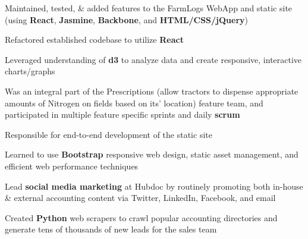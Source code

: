 \documentclass[letterpaper]{deedy-resume} %
\begin{document}
\begin{minipage}[t]{0.66\textwidth}

  \begin{tightitemize}
  \item Maintained, tested, \& added features to the FarmLogs WebApp and static site (using \textbf{React}, \textbf{Jasmine}, \textbf{Backbone}, and \textbf{HTML/CSS/jQuery})
  \item Refactored established codebase to utilize \textbf{React}
  \item Leveraged understanding of \textbf{d3} to analyze data and create responsive, interactive charts/graphs
  \item Was an integral part of the Prescriptions (allow tractors to dispense appropriate amounts of Nitrogen on fields based on its' location) feature team, and participated in multiple feature specific sprints and daily \textbf{scrum}
  \end{tightitemize}

  \sectionspace %



  \begin{tightitemize}
  \item Responsible for end-to-end development of the static site
  \item Learned to use \textbf{Bootstrap} responsive web design, static asset management, and efficient web performance techniques
  \item Lead \textbf{social media marketing} at Hubdoc by routinely promoting both in-house \& external accounting content via Twitter, LinkedIn, Facebook, and email
  \item Created \textbf{Python} web scrapers to crawl popular accounting directories and generate tens of thousands of new leads for the sales team
  \end{tightitemize}

  \sectionspace %
  

\end{minipage}
\end{document}
